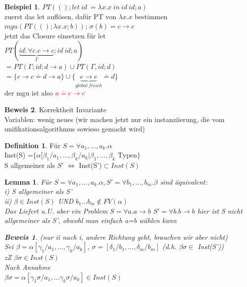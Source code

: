 \documentclass{article}
\newtheorem{lemma}{Lemma}[section]
\theoremstyle{definition}
\newtheorem{beweis}{Beweis}[section]
\newtheorem{beispiel}{Beispiel}[section]
\newtheorem{definition}{Definition}[section]
\begin{document}
	\begin{beispiel} $PT((); let\ id\ = \lambda x.x\ in \ id\ id; a)$\\
	zuerst das let auflösen, dafür PT von $\lambda x.x$ bestimmen\\
	$mgu(PT(();\lambda x.x; b))$; $\sigma(b)=c\to c$\\
	jetzt das Closure einsetzen für let\\
	$PT(\underbrace{id:\forall c.c\to c}_{\Gamma}; id\ id; a)$\\
	$=PT(\Gamma; id; d\to a)\cup PT(\Gamma, id; d)$\\
	$=\{c\to c\doteq d\to a\}\cup \{\underbrace{e\to e}_{global\ frisch} \doteq d\}$\\
	der mgu ist also $\color{red} a\doteq e\to e$
	\end{beispiel}
	\begin{beweis} Korrektheit Invariante\\
	Variablen: wenig neues (wir machen jetzt nur ein instanziierung, die vom unifikationsalgorithmus sowieso gemacht wird)\\
	\begin{definition} Für $S=\forall a_1,\dots,a_k.\alpha$\\
	Inst(S) =$\{\alpha[\beta_1/a_1,\dots,\beta_k/a_k|\beta_1,\dots, \beta_k\text{ Typen}\}$\\
	S allgemeiner als $S'$ $\iff$ Inst(S')$\subset Inst(S)$\\
	\end{definition}
	\begin{lemma} Für $S=\forall a_1,\dots, a_k.\alpha, S'=\forall b_1,\dots, b_m.\beta$ sind äquivalent:\\
	i)  S allgemeiner als S'\\
	ii) $\beta\in Inst(S)$ UND $b_1\dots b_m\notin FV(\alpha)$\\
	Das Liefert u.U. aber ein Problem $S=\forall a.a\to b$ $S' = \forall b.b\to b$ hier ist S nicht allgemeiner als S', obwohl man einfach a=b wählen kann\\
	\begin{beweis} (nur ii nach i, andere Richtung geht, brauchen wir aber nicht)\\
	Sei $\beta=\alpha[\gamma_1/a_1,\dots,\gamma_k/a_k]$, $\sigma = [\delta_1/b_1,\dots,\delta_m/b_m]$ (d.h. $\beta\sigma\in$ Inst(S'))\\
	zZ $\beta\sigma\in Inst(S)$\\
	Nach Annahme\\
	$\beta\sigma =\alpha[\gamma_1\sigma/a_1,\dots \gamma_k\sigma/a_k]\in Inst(S)$

\end{beweis}
\end{lemma}
\end{beweis}
\end{document}
